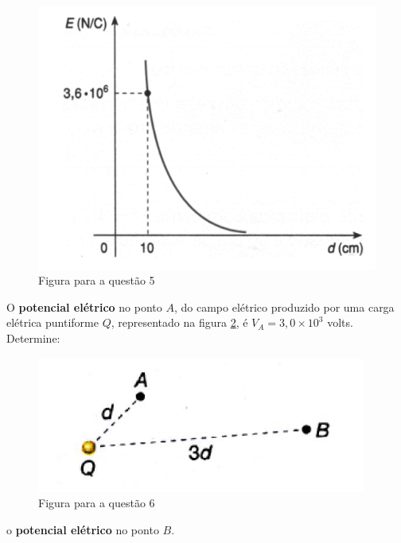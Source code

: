 \documentclass{yagoexam}
\begin{document}
\begin{questions}
		\begin{figure}[H]
			\label{figq5}
			\caption{Figura para a questão 5}
			\begin{center}
				\includegraphics[scale=0.9]{imgs/q5.PNG}
			\end{center}
		\end{figure} 
		
		\newpage
		
		\question[10]
		O \textbf{potencial elétrico} no ponto $A$, do campo elétrico produzido por uma carga elétrica
		puntiforme $Q$, representado na figura \ref{figq6}, é $V_A = 3,0 \times 10^{3}$ volts. Determine:
		
		\begin{figure}[H]
			\label{figq6}
			\caption{Figura para a questão 6}
			\begin{center}
				\includegraphics[scale=1.5]{imgs/q6.PNG}
			\end{center}
		\end{figure}
		
		\begin{parts}
			
			\item o \textbf{potencial elétrico} no ponto $B$.
			\vspace{4cm}
			

\end{parts}
\end{questions}
\end{document}
